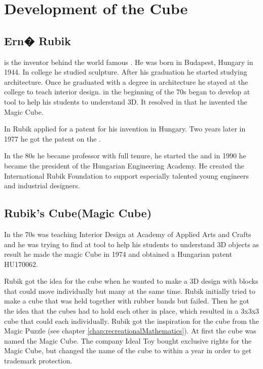 \chapter{Development of the Cube}
\section{Ern� Rubik}
\erno{} is the inventor behind the world famous \rubik{}. He was born in Budapest, Hungary in 1944.  In college he studied sculpture. After his graduation he started studying architecture.  Once he graduated with a degree in architecture he stayed at the college to teach interior design. in the beginning of the 70s began to develop at tool to help his students to understand 3D. It resolved in that he invented the Magic Cube.

In  Rubik applied for a patent for his invention in Hungary. Two years later in 1977 he got the patent on the \rubik{}.


In the 80s he became professor with full tenure, he started the  and in 1990 he became the president of the Hungarian Engineering Academy. He created the International Rubik Foundation to support especially talented young engineers and industrial designers.
 
\section{Rubik's Cube(Magic Cube)}

 In the 70s \erno{} was teaching Interior Design at Academy of Applied Arts and Crafts and he was trying to find at tool to help his students to understand 3D objects as result he made the magic Cube in 1974 and obtained a Hungarian patent HU170062. 
 
 Rubik got the idea for the cube when he wanted to make a 3D design with blocks that could move individually but many at the same time. Rubik initially tried  to make a cube that was held together with rubber bands but failed. Then he got the idea that the cubes had to hold each other in place, which resulted in a 3x3x3 cube that could \twist{} each \face{} individually. Rubik got the inspiration for the cube from the Magic Puzzle (see chapter \ref{chap:recreationalMathematics}). At first the cube was named the Magic Cube. The company Ideal Toy bought exclusive rights for the Magic Cube, but changed the name of the cube to \rubik{} within a year in order to get trademark protection.

